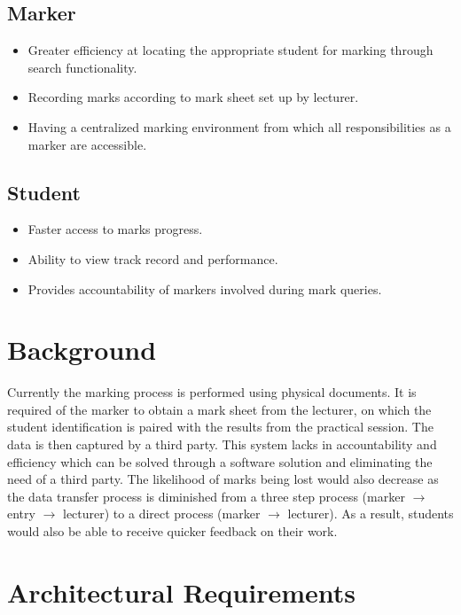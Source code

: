 \documentclass[a4paper]{article}
\begin{document}
		\subsection{Marker}
			\begin{itemize}
				\item	Greater efficiency at locating the appropriate student for marking through search functionality.
				\item	Recording marks according to mark sheet set up by lecturer.
				\item	Having a centralized marking environment from which all responsibilities as a marker are accessible.
			\end{itemize}

		\subsection{Student}
			\begin{itemize}
				\item	Faster access to marks progress.
				\item	Ability to view track record and performance.
				\item	Provides accountability of markers involved during mark queries.
			\end{itemize}

	\section{Background}

		Currently the marking process is performed using physical documents. It is required of the marker to obtain a mark sheet from the lecturer, on which the student identification is paired with the results from the practical session. The data is then captured by a third party. This system lacks in accountability and efficiency which can be solved through a software solution and eliminating the need of a third party. The likelihood of marks being lost would also decrease as the data transfer process is diminished from a three step process (marker $\rightarrow$ entry $\rightarrow$ lecturer) to a direct process (marker $\rightarrow$ lecturer). As a result, students would also be able to receive quicker feedback on their work.

	\section{Architectural Requirements}
\end{document}
